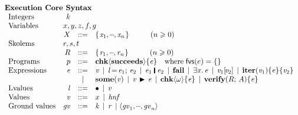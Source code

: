 



\begin{figure}[t]
  $$
\begin{array}{l}
\textbf{Execution Core Syntax} \\
  \begin{array}{lrcl@{}}
      \text{Integers} & k \\
      \text{Variables} & \multicolumn{3}{l}{x,y,z,f,g} \\
          & \ensuremath{X} & ::= & \ensuremath{\{\mskip1.5mu \Varid{x}_{\mathrm{1}},\mydots,\Varid{x}_{\Varid{n}}\mskip1.5mu\}}  \hspace{1cm} (n \geq 0)\\
      \text{Skolems} & \multicolumn{3}{l}{r,s,t} \\
          & \ensuremath{R} & ::= & \ensuremath{\{\mskip1.5mu \Varid{r}_{\mathrm{1}},\mydots,\Varid{r}_{\Varid{n}}\mskip1.5mu\}}  \hspace{1cm} (n \geq 0)\\
      \text{Programs} & p  & ::=  & \ensuremath{{\bf chk}\langle\textbf{succeeds}\rangle\{\Varid{e}\}} \quad \text{where} \; \freevars{e} = \{ \} \\
      \text{Expressions} & \ensuremath{\Varid{e}} & ::= & \ensuremath{\Varid{v}} \vb \ensuremath{\Varid{l}\hspace{-0.14em}=\hspace{-0.14em}\Varid{e}_{\mathrm{1}};\,\Varid{e}_{\mathrm{2}}} \vb \ensuremath{\Varid{e}_{\mathrm{1}}\;\rule[-0.1em]{0.15em}{0.75em}\;\Varid{e}_{\mathrm{2}}} \vb \ensuremath{\textbf{fail}}
                                     \vb \ensuremath{\exists\Varid{x}.\,\Varid{e}} \vb \ensuremath{\Varid{v}_{\mathrm{1}} [\!\Varid{v}_{\mathrm{2}}]} \vb \ensuremath{\textbf{iter}(\Varid{v}_{\mathrm{1}})\{\Varid{e}\}\{\Varid{v}_{\mathrm{2}}\}} \\
      && \vb & \ensuremath{{\bf some}(\Varid{v})} \vb \ensuremath{\Varid{v}\;\!\blacktriangleright{}\!\;\Varid{e}} \vb \ensuremath{{\bf chk}\langle\omega\rangle\{\Varid{e}\}}
      \vb \ensuremath{\textbf{verify}(R;\,A)\{\Varid{e}\}} \\
      \text{Lvalues} & \ensuremath{\Varid{l}} & ::= & \ensuremath{{\bullet}} \vb \ensuremath{\Varid{v}} \\
      \text{Values} & \ensuremath{\Varid{v}} & ::= & x  \vb \hnf \\
      \text{Ground values} & \ensuremath{\Varid{gv}} & ::= & \ensuremath{\Varid{k}} \vb \ensuremath{\Varid{r}} \vb \ensuremath{\langle\Varid{gv}_{\mathrm{1}},\mydots,\Varid{gv}_{\Varid{n}}\rangle} \\

\end{array}
\end{array}$$
\end{figure}
